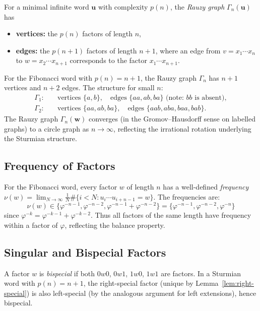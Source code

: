 For a minimal infinite word \(\mathbf{u}\) with complexity \(p(n)\),
the \emph{Rauzy graph} \(\Gamma_n(\mathbf{u})\) has
\begin{itemize}
  \item \textbf{vertices:} the \(p(n)\) factors of length \(n\),
  \item \textbf{edges:} the \(p(n+1)\) factors of length \(n+1\),
    where an edge from \(v=x_1\cdots x_n\) to \(w=x_2\cdots x_{n+1}\)
    corresponds to the factor \(x_1\cdots x_{n+1}\).
\end{itemize}
For the Fibonacci word with \(p(n)=n+1\), the Rauzy graph
\(\Gamma_n\) has \(n+1\) vertices and \(n+2\) edges.  The structure
for small \(n\):
\begin{align*}
  \Gamma_1:&\quad
    \text{vertices } \{a,b\}, \quad
    \text{edges } \{aa,ab,ba\} \text{ (note: }bb\text{ is absent)},\\
  \Gamma_2:&\quad
    \text{vertices } \{aa,ab,ba\}, \quad
    \text{edges } \{aab,aba,baa,bab\}.
\end{align*}
The Rauzy graph \(\Gamma_n(\mathbf{w})\) converges (in the Gromov--Hausdorff
sense on labelled graphs) to a circle graph as \(n\to\infty\), reflecting
the irrational rotation underlying the Sturmian structure.

\subsection{Frequency of Factors}
\label{subsec:ch19-factor-freq}

For the Fibonacci word, every factor \(w\) of length \(n\) has a
well-defined \emph{frequency} \(\nu(w)=\lim_{N\to\infty}\frac{1}{N}\#\{i<N:u_i\cdots u_{i+n-1}=w\}\).
The frequencies are:
\[
  \nu(w) \in \bigl\{ \varphi^{-n-1}, \varphi^{-n-2}, \varphi^{-n-1}+\varphi^{-n-2} \bigr\}
  = \bigl\{ \varphi^{-n-1}, \varphi^{-n-2}, \varphi^{-n} \bigr\}
\]
since \(\varphi^{-k}=\varphi^{-k-1}+\varphi^{-k-2}\).  Thus all
factors of the same length have frequency within a factor of \(\varphi\),
reflecting the balance property.

\subsection{Singular and Bispecial Factors}
\label{subsec:ch19-bispecial}

A factor \(w\) is \emph{bispecial} if both \(0w0\), \(0w1\), \(1w0\),
\(1w1\) are factors.  In a Sturmian word with \(p(n)=n+1\), the right-special
factor (unique by Lemma~\ref{lem:right-special}) is also left-special
(by the analogous argument for left extensions), hence bispecial.


